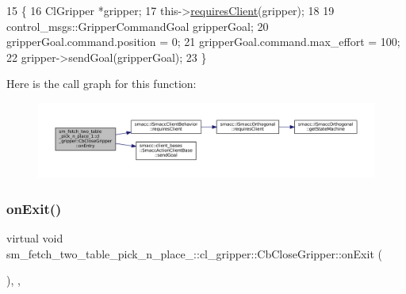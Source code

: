 \begin{DoxyCode}
15     \{
16         ClGripper *gripper;
17         this->\hyperlink{classsmacc_1_1ISmaccClientBehavior_a32b16e99e3b4cb289414203dc861a440}{requiresClient}(gripper);
18 
19         control\_msgs::GripperCommandGoal gripperGoal;
20         gripperGoal.command.position = 0;
21         gripperGoal.command.max\_effort = 100;
22         gripper->sendGoal(gripperGoal);
23     \}
\end{DoxyCode}
Here is the call graph for this function\+:
\nopagebreak
\begin{figure}[H]
\begin{center}
\leavevmode
\includegraphics[width=350pt]{classsm__fetch__two__table__pick__n__place__1_1_1cl__gripper_1_1CbCloseGripper_a7f8673e6353c05f3d71225607b2e40bc_cgraph}
\end{center}
\end{figure}
\mbox{\label{classsm__fetch__two__table__pick__n__place__1_1_1cl__gripper_1_1CbCloseGripper_a2e50c2e1dec2bdf6cefa39b715ea5d00}} 
\subsubsection{\texorpdfstring{on\+Exit()}{onExit()}}
{\footnotesize\ttfamily virtual void sm\+\_\+fetch\+\_\+two\+\_\+table\+\_\+pick\+\_\+n\+\_\+place\+\_\+::cl\+\_\+gripper\+::\+Cb\+Close\+Gripper\+::on\+Exit (\begin{DoxyParamCaption}{ }\end{DoxyParamCaption})\hspace{0.3cm}{\ttfamily [inline]}, {\ttfamily [override]}, {\ttfamily [virtual]}}



